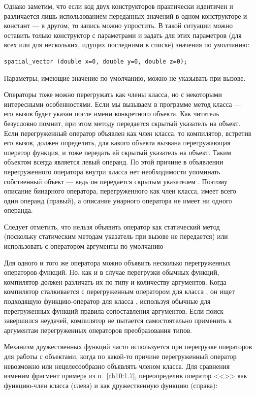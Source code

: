 Однако заметим, что если код двух конструкторов практически идентичен и различается лишь использованием переданных
значений в одном конструкторе и констант --- в другом, то запись можно упростить. В такой ситуации можно оставить только
конструктор с параметрами и задать для этих параметров (для всех или для нескольких, идущих последними в списке)
значения по умолчанию:
\begin{lstlisting}
spatial_vector (double x=0, double y=0, double z=0);
\end{lstlisting}

Параметры, имеющие значение по умолчанию, можно не указывать при вызове.

Операторы тоже можно перегружать как члены класса, но с некоторыми интересными особенностями. Если мы вызываем в
программе метод класса --- его вызов  будет указан после имени конкретного объекта. Как читатель безусловно помнит, при
этом методу передается скрытый указатель на объект. Если перегруженный оператор объявлен как член класса, то
компилятор, встретив его вызов, должен определить, для какого объекта вызвана перегружающая оператор функция, и тоже
передать ей скрытый указатель на объект. Таким объектом всегда является левый операнд. По этой причине в объявлении
перегруженного оператора внутри класса нет необходимости упоминать собственный объект --- ведь он передается скрытым
указателем . Поэтому описание бинарного оператора, перегруженного как член класса, имеет
всего один операнд (правый), а описание унарного оператора не имеет ни одного операнда. 

Следует отметить, что нельзя объявить оператор как статический метод (поскольку статическим методам указатель
 при вызове не передается) или использовать с оператором аргументы по умолчанию

Для одного и того же оператора можно объявить несколько перегруженных операторов-функций. Но, как и в случае перегрузки
обычных функций, компилятор должен различать их по типу и количеству аргументов. Когда компилятор сталкивается с
перегруженным оператором для класса , он ищет  подходящую функцию-оператор для класса
, используя обычные для перегруженных функций правила сопоставления аргументов. Если поиск
завершился неудачей,  компилятор не пытается самостоятельно применить к аргументам перегруженных операторов
преобразования типов.

Механизм дружественных функций часто используется при перегрузке операторов для работы с объектами,
когда по какой-то причине перегруженный оператор невозможно или нецелесообразно объявлять членом класса. Для сравнения
изменим фрагмент примера из п.~\ref{ch10:1.7}, переопределив оператор
<<\Sys{+}>> как функцию-член класса (слева) и как дружественную функцию (справа):

